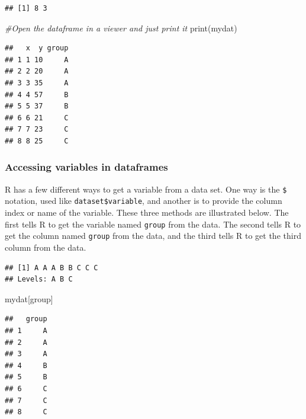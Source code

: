 \documentclass[
]{article}
\newenvironment{Shaded}{\begin{snugshade}}{\end{snugshade}}
\newcommand{\CommentTok}[1]{\textcolor[rgb]{0.56,0.35,0.01}{\textit{#1}}}
\newcommand{\FunctionTok}[1]{\textcolor[rgb]{0.00,0.00,0.00}{#1}}
\newcommand{\NormalTok}[1]{#1}
\newcommand{\SpecialCharTok}[1]{\textcolor[rgb]{0.00,0.00,0.00}{#1}}
\newcommand{\StringTok}[1]{\textcolor[rgb]{0.31,0.60,0.02}{#1}}
\begin{document}
\begin{verbatim}
## [1] 8 3
\end{verbatim}

\begin{Shaded}
\begin{Highlighting}[]
\CommentTok{\#Open the dataframe in a viewer and just print it}
\FunctionTok{print}\NormalTok{(mydat)}
\end{Highlighting}
\end{Shaded}

\begin{verbatim}
##   x  y group
## 1 1 10     A
## 2 2 20     A
## 3 3 35     A
## 4 4 57     B
## 5 5 37     B
## 6 6 21     C
## 7 7 23     C
## 8 8 25     C
\end{verbatim}

\hypertarget{accessing-variables-in-dataframes}{%
\subsubsection{Accessing variables in dataframes}\label{accessing-variables-in-dataframes}}

R has a few different ways to get a variable from a data set. One way is
the \texttt{\$} notation, used like \texttt{dataset\$variable}, and another is to
provide the column index or name of the variable. These three methods
are illustrated below. The first tells R to get the variable named
\texttt{group} from the data. The second tells R to get the column named
\texttt{group} from the data, and the third tells R to get the third column
from the data.

\begin{Shaded}
\end{Shaded}

\begin{verbatim}
## [1] A A A B B C C C
## Levels: A B C
\end{verbatim}

\begin{Shaded}
\begin{Highlighting}[]
\NormalTok{mydat[}\StringTok{\textquotesingle{}group\textquotesingle{}}\NormalTok{] }
\end{Highlighting}
\end{Shaded}

\begin{verbatim}
##   group
## 1     A
## 2     A
## 3     A
## 4     B
## 5     B
## 6     C
## 7     C
## 8     C
\end{verbatim}
\end{document}
